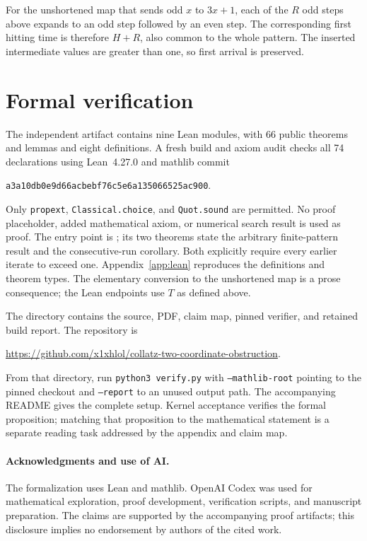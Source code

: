 \documentclass[11pt,a4paper]{article}
\newcommand{\code}[1]{\texttt{#1}}
\begin{document}
For the unshortened map that sends odd $x$ to $3x+1$, each
of the $R$ odd steps above expands to an odd step followed by an
even step. The corresponding first hitting time is therefore
$H+R$, also common to the whole pattern. The inserted intermediate
values are greater than one, so first arrival is preserved.


\section{Formal verification}
The independent artifact contains nine Lean modules, with 66 public
theorems and lemmas and eight definitions. A fresh build and axiom
audit checks all 74 declarations using Lean~4.27.0 and mathlib commit
\begin{center}\scriptsize
\code{a3a10db0e9d66acbebf76c5e6a135066525ac900}.
\end{center}
Only \code{propext}, \code{Classical.choice}, and \code{Quot.sound}
are permitted. No proof placeholder, added mathematical axiom, or
numerical search result is used as proof. The entry point is
; its two theorems state
the arbitrary finite-pattern result and the consecutive-run corollary.
Both explicitly require every earlier iterate to exceed one.
Appendix~\ref{app:lean} reproduces the definitions and theorem types.
The elementary conversion to the unshortened map is a prose consequence;
the Lean endpoints use $T$ as defined above.

The  directory contains the source, PDF,
claim map, pinned verifier, and retained build report. The repository is
\begin{center}\scriptsize
\url{https://github.com/x1xhlol/collatz-two-coordinate-obstruction}.
\end{center}
From that directory, run \code{python3 verify.py} with
\code{--mathlib-root} pointing to the pinned checkout and
\code{--report} to an unused output path. The accompanying README gives
the complete setup. Kernel acceptance verifies the formal proposition;
matching that proposition to the mathematical statement is a separate
reading task addressed by the appendix and claim map.

\paragraph{Acknowledgments and use of AI.}
The formalization uses Lean and mathlib. OpenAI Codex was used for
mathematical exploration, proof development, verification scripts,
and manuscript preparation. The claims are supported by the
accompanying proof artifacts; this disclosure implies no endorsement
by authors of the cited work.
\end{document}
